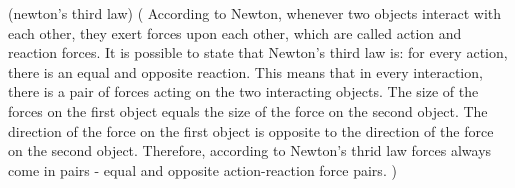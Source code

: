 \newglossaryentry(newton's third law)
(
According to Newton, whenever two objects interact with each other, they exert forces upon each other, which are called action and reaction forces. It is possible to state that Newton's third law is: for every action, there is an equal and opposite reaction. This means that in every interaction, there is a pair of forces acting on the two interacting objects. The size of the forces on the first object equals the size of the force on the second object. The direction of the force on the first object is opposite to the direction of the force on the second object. Therefore, according to Newton's thrid law forces always come in pairs - equal and opposite action-reaction force pairs. 
     )
